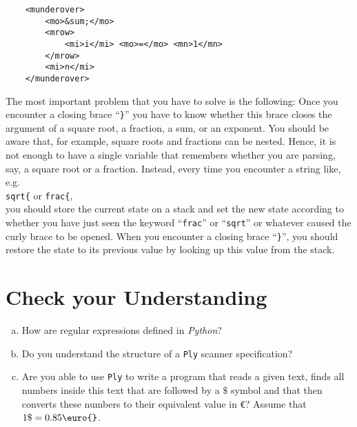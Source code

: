 \begin{enumerate}
    \begin{verbatim}
    <munderover>
        <mo>&sum;</mo>
        <mrow>
            <mi>i</mi> <mo>=</mo> <mn>1</mn>
        </mrow>
        <mi>n</mi>
    </munderover>
    \end{verbatim}
\end{enumerate}

\remarkEng
The most important problem that you have to solve is the following:  Once you encounter a closing brace
``\texttt{\}}'' you have to know whether this brace closes the argument of a square root, a
fraction, a sum, or an exponent.  You should be aware that, for example, square roots and fractions
can be nested.  Hence, it is not enough to have a single variable that remembers whether you are
parsing, say, a square root or a fraction.  Instead, every time you encounter a string like, e.g.
\\[0.2cm]
\hspace*{1.3cm}
\texttt{sqrt\{} \quad or \quad \texttt{frac\{},
\\[0.2cm]
you should store the current state on a stack and set the new state according to whether you have just seen the
keyword ``\texttt{frac}'' or ``\texttt{sqrt}'' or whatever caused the
curly brace to be opened.  When you encounter a closing brace ``\texttt{\}}'', you should 
restore the state to its previous value by looking up this value from the stack.  
\eox

\section{Check your Understanding}
\begin{enumerate}[(a)]
\item How are regular expressions defined in \textsl{Python}?
\item Do you understand the structure of a \texttt{Ply} scanner specification?
\item Are you able to use \texttt{Ply} to write a program that reads a given text, finds all numbers inside
      this text that are followed by a $\texttt{\$}$ symbol and that then converts these numbers to their equivalent
      value in \texttt{\euro{}}?  Assume that $1 \mathtt{\$} = 0.85 \texttt{\euro{}}$.
\end{enumerate}



